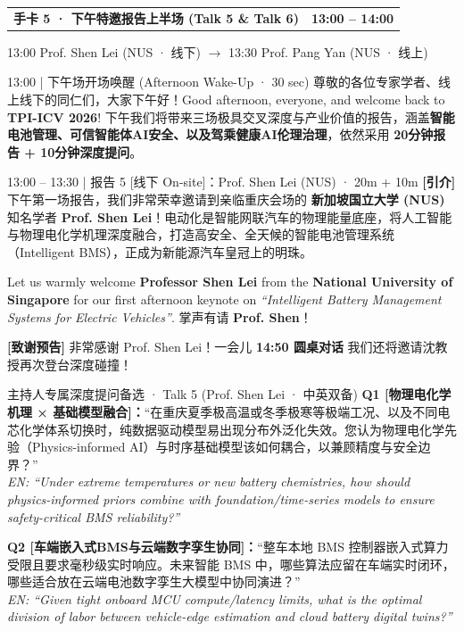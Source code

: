 \documentclass[12pt,a4paper]{article}
\makeatletter
\newcommand{\cardbanner}[3]{%
  \begin{tcolorbox}[
    enhanced, colback=nusnavy, colframe=nusnavy, arc=1.8mm,
    boxrule=0pt, left=3.8mm, right=3.8mm, top=2.1mm, bottom=2.2mm,
    before skip=0pt, after skip=2.4mm,
    borderline south={1.1mm}{0mm}{nusorange}
  ]
    \begin{tabularx}{\linewidth}{@{}X r@{}}
      {\fontsize{13.2}{16}\selectfont\color{white}\textbf{#1}} &
      {\fontsize{11.2}{14}\selectfont\color{orangebg}\textbf{#2}}
    \end{tabularx}
    \vspace{0.6mm}
    {\fontsize{9.3}{11.8}\selectfont\color{slate200}#3}
  \end{tcolorbox}
}
\makeatother
\begin{document}
\cardbanner{手卡 5 · 下午特邀报告上半场 (Talk 5 \& Talk 6)}{13:00 – 14:00}{13:00 Prof. Shen Lei (NUS · 线下) $\rightarrow$ 13:30 Prof. Pang Yan (NUS · 线上)}

\begin{transbox}{13:00 \;|\; 下午场开场唤醒 (Afternoon Wake-Up · 30 sec)}
\fontsize{11}{15.6}\selectfont
尊敬的各位专家学者、线上线下的同仁们，大家下午好！Good afternoon, everyone, and welcome back to \textbf{TPI-ICV 2026}! 下午我们将带来三场极具交叉深度与产业价值的报告，涵盖\textbf{智能电池管理、可信智能体AI安全、以及驾乘健康AI伦理治理}，依然采用 \textbf{20分钟报告 + 10分钟深度提问}。
\end{transbox}

\begin{scriptbox}{13:00 – 13:30 \;|\; 报告 5 [线下 On-site]：Prof. Shen Lei (NUS) · 20m + 10m}
\fontsize{11.2}{16}\selectfont
\textbf{[引介]} 下午第一场报告，我们非常荣幸邀请到亲临重庆会场的 \textbf{新加坡国立大学 (NUS)} 知名学者 \textbf{Prof. Shen Lei}！电动化是智能网联汽车的物理能量底座，将人工智能与物理电化学机理深度融合，打造高安全、全天候的智能电池管理系统（Intelligent BMS），正成为新能源汽车皇冠上的明珠。\par
Let us warmly welcome \textbf{Professor Shen Lei} from the \textbf{National University of Singapore} for our first afternoon keynote on \textit{``Intelligent Battery Management Systems for Electric Vehicles''}. 掌声有请 \textbf{Prof. Shen}！\par
\textbf{[致谢预告]} 非常感谢 Prof. Shen Lei！一会儿 \textbf{14:50 圆桌对话} 我们还将邀请沈教授再次登台深度碰撞！
\end{scriptbox}
\begin{qabox}{主持人专属深度提问备选 · Talk 5 (Prof. Shen Lei · 中英双备)}
\fontsize{10.1}{14.3}\selectfont
\textbf{Q1 [物理电化学机理 × 基础模型融合]：}“在重庆夏季极高温或冬季极寒等极端工况、以及不同电芯化学体系切换时，纯数据驱动模型易出现分布外泛化失效。您认为物理电化学先验（Physics-informed AI）与时序基础模型该如何耦合，以兼顾精度与安全边界？” \\
\textit{EN: ``Under extreme temperatures or new battery chemistries, how should physics-informed priors combine with foundation/time-series models to ensure safety-critical BMS reliability?''}\par
\textbf{Q2 [车端嵌入式BMS与云端数字孪生协同]：}“整车本地 BMS 控制器嵌入式算力受限且要求毫秒级实时响应。未来智能 BMS 中，哪些算法应留在车端实时闭环，哪些适合放在云端电池数字孪生大模型中协同演进？” \\
\textit{EN: ``Given tight onboard MCU compute/latency limits, what is the optimal division of labor between vehicle-edge estimation and cloud battery digital twins?''}
\end{qabox}
\end{document}
